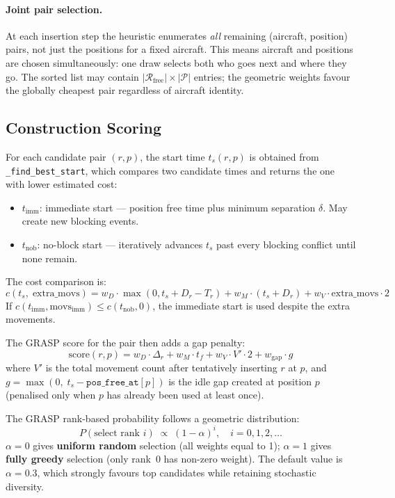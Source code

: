 \paragraph{Joint pair selection.}
At each insertion step the heuristic enumerates \emph{all} remaining
(aircraft, position) pairs, not just the positions for a fixed aircraft.
This means aircraft and positions are chosen simultaneously: one draw selects
both who goes next and where they go.  The sorted list may contain
$|{\mathcal R}_{\text{free}}| \times |\mathcal{P}|$ entries; the geometric
weights favour the globally cheapest pair regardless of aircraft identity.

\subsection{Construction Scoring}

For each candidate pair $(r, p)$, the start time $t_s(r, p)$ is obtained from
\texttt{\_find\_best\_start}, which compares two candidate times and returns
the one with lower estimated cost:

\begin{itemize}[noitemsep]
    \item $t_{\text{imm}}$: immediate start — position free time plus minimum
          separation $\delta$.  May create new blocking events.
    \item $t_{\text{nob}}$: no-block start — iteratively advances $t_s$ past
          every blocking conflict until none remain.
\end{itemize}

The cost comparison is:
\[
    c(t_s,\; \text{extra\_movs})
    = w_D \cdot \max(0, t_s + D_r - T_r)
    + w_M \cdot (t_s + D_r)
    + w_V \cdot \text{extra\_movs} \cdot 2
\]
If $c(t_{\text{imm}}, \text{movs}_{\text{imm}}) \leq c(t_{\text{nob}}, 0)$,
the immediate start is used despite the extra movements.

The GRASP score for the pair then adds a gap penalty:
\begin{equation}
    \text{score}(r, p)
    = w_D \cdot \Delta_r
    + w_M \cdot t_f
    + w_V \cdot V' \cdot 2
    + w_{\text{gap}} \cdot g
    \label{eq:grasp-score}
\end{equation}
where $V'$ is the total movement count after tentatively inserting $r$ at $p$,
and $g = \max(0,\; t_s - \texttt{pos\_free\_at}[p])$ is the idle gap created
at position $p$ (penalised only when $p$ has already been used at least once).

The GRASP rank-based probability follows a geometric distribution:
\begin{equation}
    P(\text{select rank } i) \;\propto\; (1 - \alpha)^i, \quad i = 0, 1, 2, \ldots
    \label{eq:grasp-weights}
\end{equation}
$\alpha = 0$ gives \textbf{uniform random} selection (all weights equal to 1);
$\alpha = 1$ gives \textbf{fully greedy} selection (only rank~0 has non-zero
weight).  The default value is $\alpha = 0.3$, which strongly favours top
candidates while retaining stochastic diversity.

